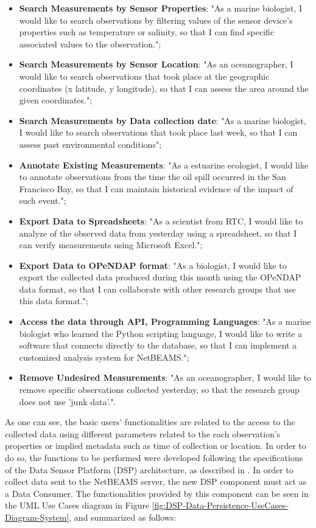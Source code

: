 \begin{itemize}
  \item \textbf{Search Measurements by Sensor Properties}: "As a marine
  biologist, I would like to search observations by filtering values of the 
  sensor device's properties such as temperature or salinity, so that I can 
  find specific associated values to the observation.";
  \item \textbf{Search Measurements by Sensor Location}: "As an oceanographer,
  I would like to search observations that took place at the geographic
  coordinates (x latitude, y longitude), so that I can assess the area around
  the given coordinates.";
  \item \textbf{Search Measurements by Data collection date}: "As a marine 
  biologist, I would like to search observations that took place last week, 
  so that I can assess past environmental conditions";
  \item \textbf{Annotate Existing Measurements}: "As a estuarine ecologist,
  I would like to annotate observations from the time the oil spill occurred
  in the San Francisco Bay, so that I can maintain historical evidence of 
  the impact of such event.";
  \item \textbf{Export Data to Spreadsheets}: "As a scientist from RTC, I 
  would like to analyze of the observed data from yesterday using a 
  spreadsheet, so that I can verify measurements using Microsoft Excel.";
  \item \textbf{Export Data to OPeNDAP format}: "As a biologist, I would 
  like to export the collected data produced during this month using the
  OPeNDAP data format, so that I can collaborate with other research groups
  that use this data format.";
  \item \textbf{Access the data through API, Programming Languages}: "As a
  marine biologist who learned the Python scripting language, I would like to
  write a software that connects directly to the database, so that I can
  implement a customized analysis system for NetBEAMS.";
  \item \textbf{Remove Undesired Measurements}: "As an oceanographer, I
  would like to remove specific observations collected yesterday, 
  so that the research group does not use 'junk data'.".
\end{itemize}

As one can see, the basic users' functionalities are related to the access to
the collected data using different parameters related to the each observation's
properties or implied metadata such as time of collection or location. In order
to do so, the functions to be performed were developed following the
specifications of the Data Sensor Platform (DSP) architecture, as described in
\cite{netbeams-dsp-architecture}. In order to collect data sent to the NetBEAMS
server, the new DSP component must act as a Data Consumer. The functionalities
provided by this component can be seen in the UML Use Cases diagram \cite{uml}
in Figure \ref{fig:DSP-Data-Persistence-UseCases-Diagram-System}, and
summarized as follows:

